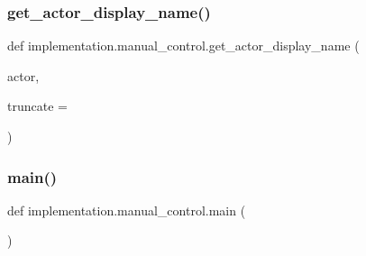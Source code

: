 \subsubsection{\texorpdfstring{get\+\_\+actor\+\_\+display\+\_\+name()}{get\_actor\_display\_name()}}
{\footnotesize\ttfamily def implementation.\+manual\+\_\+control.\+get\+\_\+actor\+\_\+display\+\_\+name (\begin{DoxyParamCaption}\item[{}]{actor,  }\item[{}]{truncate = {} }\end{DoxyParamCaption})}

\mbox{\label{namespaceimplementation_1_1manual__control_a34212fc7e38fc4b7badc73dbd015f55a}} 
\subsubsection{\texorpdfstring{main()}{main()}}
{\footnotesize\ttfamily def implementation.\+manual\+\_\+control.\+main (\begin{DoxyParamCaption}{ }\end{DoxyParamCaption})}

